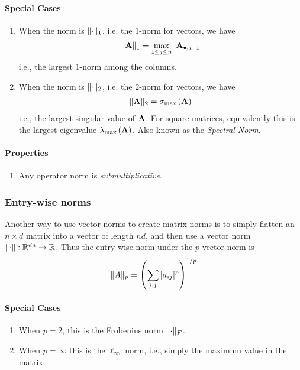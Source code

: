    \paragraph{Special Cases}
   \begin{enumerate}
       \item When the norm is $\lVert \cdot \rVert_1$, i.e. the $1$-norm for vectors, we have
       \begin{align*}
           \lVert \mathbf{A} \rVert_1 = \max_{1 \leq j \leq n} \lVert \mathbf{A}_{\bullet, j} \rVert_1
       \end{align*}
       i.e., the largest $1$-norm among the columns.
       \item When the norm is $\lVert \cdot \rVert_2$, i.e. the $2$-norm for vectors, we have
       \begin{align*}
           \lVert \mathbf{A} \rVert_2 = \sigma_{\max{}}(\mathbf{A})
       \end{align*}
       i.e., the largest singular value of $\mathbf{A}$. For square matrices, equivalently this is the largest
       eigenvalue $\lambda_{\max{}}(\mathbf{A})$. Also known as the {\em Spectral Norm}.
   \end{enumerate}
   \paragraph{Properties}
   \begin{enumerate}
       \item Any operator norm is {\em submultiplicative}.
   \end{enumerate}

\subsubsection{Entry-wise norms}
   Another way to use vector norms to create matrix norms is to simply flatten an $n \times d$ matrix into a vector
   of length $nd$, and then use a vector norm $\lVert \cdot \rVert: \mathbb{R}^{dn} \to \mathbb{R}$. Thus the entry-wise norm under
   the $p$-vector norm is
   \begin{align*}
       \lVert A \rVert_p = \left( \sum_{i,j} |a_{ij}|^p \right)^{1/p}
   \end{align*}
   \paragraph{Special Cases}
   \begin{enumerate}
       \item When $p = 2$, this is the Frobenius norm $\lVert \cdot \rVert_F$.
       \item When $p = \infty$ this is the $\ell_\infty$ norm, i.e., simply the maximum value in the matrix.
   \end{enumerate}
